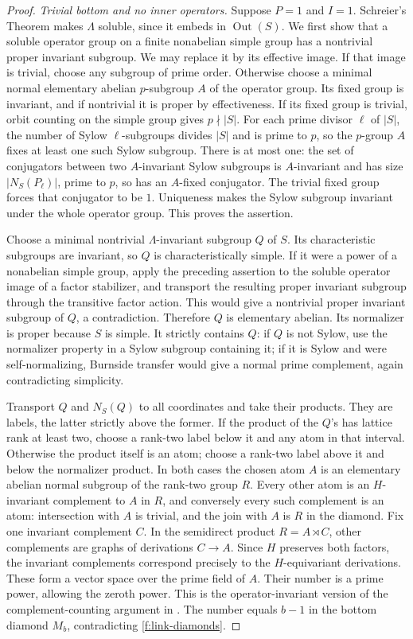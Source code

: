 \begin{proof}
\emph{Trivial bottom and no inner operators.}
Suppose $P=1$ and $I=1$. Schreier's Theorem makes $\Lambda$ soluble, since
it embeds in $\operatorname{Out}(S)$. We first show that a soluble operator
group on a finite nonabelian simple group has a nontrivial proper invariant
subgroup. We may replace it by its effective image. If that image is
trivial, choose any subgroup of prime order. Otherwise choose a minimal
normal elementary abelian $p$-subgroup $A$ of the operator group. Its fixed
group is invariant, and if nontrivial it is proper by effectiveness.
If its fixed group is trivial, orbit counting on the simple group gives
$p\nmid|S|$. For each prime divisor $\ell$ of $|S|$, the number of Sylow
$\ell$-subgroups divides $|S|$ and is prime to $p$, so the $p$-group $A$
fixes at least one such Sylow subgroup. There is at most one: the set of
conjugators between two $A$-invariant Sylow subgroups is $A$-invariant and
has size $|N_S(P_\ell)|$, prime to $p$, so has an $A$-fixed conjugator.
The trivial fixed group forces that conjugator to be $1$. Uniqueness
makes the Sylow subgroup invariant under the whole operator group.
This proves the assertion.

Choose a minimal nontrivial $\Lambda$-invariant subgroup $Q$ of $S$.
Its characteristic subgroups are invariant, so $Q$ is characteristically
simple. If it were a power of a nonabelian simple group, apply the
preceding assertion to the soluble operator image of a factor stabilizer,
and transport the resulting proper invariant subgroup through the
transitive factor action. This would give a nontrivial proper invariant
subgroup of $Q$, a contradiction. Therefore $Q$ is elementary abelian.
Its normalizer is proper because $S$ is simple. It strictly contains $Q$:
if $Q$ is not Sylow, use the normalizer property in a Sylow subgroup
containing it; if it is Sylow and were self-normalizing, Burnside transfer
would give a normal prime complement, again contradicting simplicity.

Transport $Q$ and $N_S(Q)$ to all coordinates and take their products.
They are labels, the latter strictly above the former. If the product of
the $Q$'s has lattice rank at least two, choose a rank-two label below it
and any atom in that interval. Otherwise the product itself is an atom;
choose a rank-two label above it and below the normalizer product. In both
cases the chosen atom $A$ is an elementary abelian normal subgroup of the
rank-two group $R$. Every other atom is an $H$-invariant complement to
$A$ in $R$, and conversely every such complement is an atom: intersection
with $A$ is trivial, and the join with $A$ is $R$ in the diamond.
Fix one invariant complement $C$. In the semidirect product $R=A\rtimes C$,
other complements are graphs of derivations $C\to A$. Since $H$ preserves
both factors, the invariant complements correspond precisely to the
$H$-equivariant derivations. These form a vector space over the prime field
of $A$. Their number is a prime power, allowing the zeroth power.
This is the operator-invariant version of the complement-counting
argument in \citet[Theorem~3]{PalfyPudlak1980}.
The number equals $b-1$ in the bottom diamond $M_b$, contradicting
\ref{f:link-diamonds}.


\end{proof}
